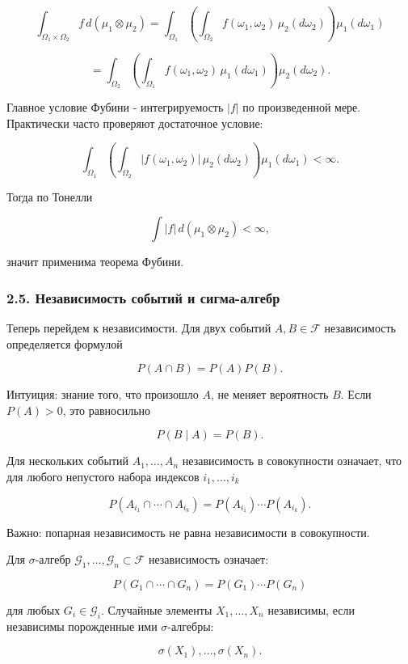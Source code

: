 \documentclass[
  11pt,
  a4paper,
]{article}
\begin{document}
\[
\int_{\Omega_1\times\Omega_2} f\,d(\mu_1\otimes\mu_2)
=
\int_{\Omega_1}
\left(\int_{\Omega_2} f(\omega_1,\omega_2)\,\mu_2(d\omega_2)\right)
\mu_1(d\omega_1)
\]

\[
=
\int_{\Omega_2}
\left(\int_{\Omega_1} f(\omega_1,\omega_2)\,\mu_1(d\omega_1)\right)
\mu_2(d\omega_2).
\]

Главное условие Фубини - интегрируемость \(|f|\) по произведенной мере.
Практически часто проверяют достаточное условие:

\[
\int_{\Omega_1}
\left(\int_{\Omega_2}|f(\omega_1,\omega_2)|\,\mu_2(d\omega_2)\right)
\mu_1(d\omega_1)
<\infty.
\]

Тогда по Тонелли

\[
\int |f|\,d(\mu_1\otimes\mu_2)<\infty,
\]

значит применима теорема Фубини.

\subsubsection{2.5. Независимость событий и
сигма-алгебр}\label{ux43dux435ux437ux430ux432ux438ux441ux438ux43cux43eux441ux442ux44c-ux441ux43eux431ux44bux442ux438ux439-ux438-ux441ux438ux433ux43cux430-ux430ux43bux433ux435ux431ux440}

Теперь перейдем к независимости. Для двух событий \(A,B\in\mathcal F\)
независимость определяется формулой

\[
P(A\cap B)=P(A)P(B).
\]

Интуиция: знание того, что произошло \(A\), не меняет вероятность \(B\).
Если \(P(A)>0\), это равносильно

\[
P(B\mid A)=P(B).
\]

Для нескольких событий \(A_1,\ldots,A_n\) независимость в совокупности
означает, что для любого непустого набора индексов \(i_1,\ldots,i_k\)

\[
P(A_{i_1}\cap\cdots\cap A_{i_k})
=
P(A_{i_1})\cdots P(A_{i_k}).
\]

Важно: попарная независимость не равна независимости в совокупности.

Для \(\sigma\)-алгебр
\(\mathcal G_1,\ldots,\mathcal G_n\subset\mathcal F\) независимость
означает:

\[
P(G_1\cap\cdots\cap G_n)
=
P(G_1)\cdots P(G_n)
\]

для любых \(G_i\in\mathcal G_i\). Случайные элементы \(X_1,\ldots,X_n\)
независимы, если независимы порожденные ими \(\sigma\)-алгебры:

\[
\sigma(X_1),\ldots,\sigma(X_n).
\]
\end{document}
